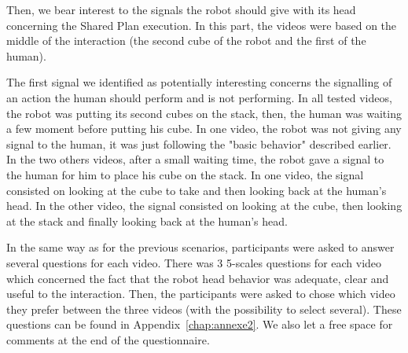 \documentclass[english,a4paper,11pt,twoside]{StyleThese}
\begin{document}
Then, we bear interest to the signals the robot should give with its head concerning the Shared Plan execution. In this part, the videos were based on the middle of the interaction (the second cube of the robot and the first of the human).

The first signal we identified as potentially interesting concerns the signalling of an action the human should perform and is not performing. In all tested videos, the robot was putting its second cubes on the stack, then, the human was waiting a few moment before putting his cube. In one video, the robot was not giving any signal to the human, it was just following the "basic behavior" described earlier. In the two others videos, after a small waiting time, the robot gave a signal to the human for him to place his cube on the stack. In one video, the signal consisted on looking at the cube to take and then looking back at the human's head. In the other video, the signal consisted on looking at the cube, then looking at the stack and finally looking back at the human's head.

In the same way as for the previous scenarios, participants were asked to answer several questions for each video. There was 3 5-scales questions for each video which concerned the fact that the robot head behavior was adequate, clear and useful to the interaction. Then, the participants were asked to chose which video they prefer between the three videos (with the possibility to select several). These questions can be found in Appendix~\ref{chap:annexe2}. We also let a free space for comments at the end of the questionnaire.
\end{document}
